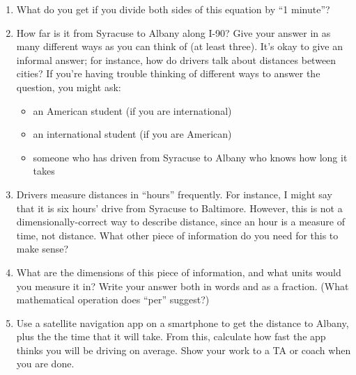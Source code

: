 \documentclass[12pt]{article}
\newcommand{\BI}{\begin{itemize}}
\newcommand{\EI}{\end{itemize}}
\begin{document}
\begin{enumerate}

\item What do you get if you divide both sides of this equation by ``1 minute''?



\vspace{1in}

\item How far is it from Syracuse to Albany along I-90? Give your answer in as many different ways as you can think of
(at least three). It's okay to give an informal answer; for instance, how do drivers talk about distances between cities?
If you're having trouble thinking of different ways to answer the question, you might ask:

\BI
\item an American student (if you are international)
\item an international student (if you are American)
\item someone who has driven from Syracuse to Albany who knows how long it takes
\EI

\vspace{3in}


\newpage

\item Drivers measure distances in ``hours'' frequently. For instance, I might say that it is six hours' drive 
from Syracuse to Baltimore. However, this is not a dimensionally-correct way to describe distance, since an hour
is a measure of time, not distance. What other piece of information do you need for this to make sense?

\vspace{2in}

\item What are the dimensions of this piece of information, and what units would you measure it in? Write your answer both in
words and as a fraction. (What mathematical operation does ``per'' suggest?)

\vspace{2in}
\newpage

\item Use a satellite navigation app on a smartphone to get the distance to Albany, plus the the time that it will take.
From this, calculate how fast the app thinks you will be driving on average. Show your work to a TA or coach when you are done.

\vspace{2in}


\end{enumerate}
\end{document}
